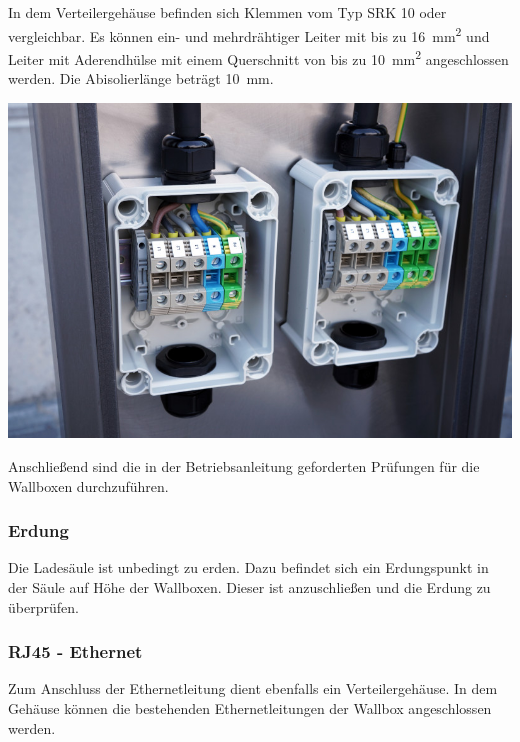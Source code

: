 \documentclass[a4paper,10pt]{article}
\begin{document}
\begin{multicols*}{2}
	In dem Verteilergehäuse befinden sich Klemmen vom Typ SRK 10
	oder vergleichbar. Es können ein- und mehrdrähtiger Leiter mit bis zu
	\SI{16}{\square\milli\meter} und Leiter mit Aderendhülse mit einem
	Querschnitt von bis zu \SI{10}{\square\milli\meter} angeschlossen werden.
	Die Abisolierlänge beträgt \SI{10}{\milli\meter}.
	

	\begin{center}
		\includegraphics[width=\linewidth]{./img/warp-charger-stand-clamps}
	\end{center}

	Anschließend sind die in der Betriebsanleitung geforderten Prüfungen für die
	Wallboxen durchzuführen.

	\subsubsection{Erdung}
	Die Ladesäule ist unbedingt zu erden. Dazu befindet sich ein Erdungspunkt in
	der Säule auf Höhe der Wallboxen. Dieser ist anzuschließen und die Erdung zu
	überprüfen.

	\subsubsection{RJ45 - Ethernet}
	Zum Anschluss der Ethernetleitung dient ebenfalls ein Verteilergehäuse.
	In dem Gehäuse können die bestehenden Ethernetleitungen der Wallbox
	angeschlossen werden.


\end{multicols*}
\end{document}
